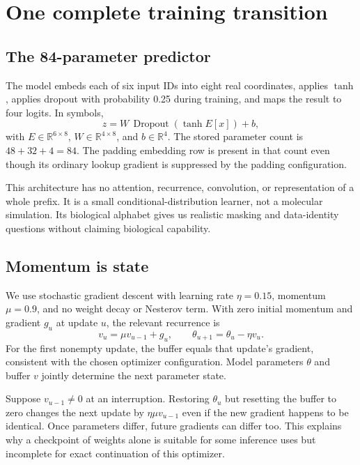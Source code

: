 \section{One complete training transition}

\subsection{The 84-parameter predictor}

The model embeds each of six input IDs into eight real coordinates, applies $\tanh$, applies dropout with probability 0.25 during training, and maps the result to four logits. In symbols,
\begin{equation}
z=W\,\operatorname{Dropout}(\tanh E[x])+b,
\end{equation}
with $E\in\mathbb R^{6\times8}$, $W\in\mathbb R^{4\times8}$, and $b\in\mathbb R^4$. The stored parameter count is $48+32+4=84$. The padding embedding row is present in that count even though its ordinary lookup gradient is suppressed by the padding configuration.

This architecture has no attention, recurrence, convolution, or representation of a whole prefix. It is a small conditional-distribution learner, not a molecular simulation. Its biological alphabet gives us realistic masking and data-identity questions without claiming biological capability.

\subsection{Momentum is state}

We use stochastic gradient descent with learning rate $\eta=0.15$, momentum $\mu=0.9$, and no weight decay or Nesterov term. With zero initial momentum and gradient $g_u$ at update $u$, the relevant recurrence is
\begin{equation}
v_u=\mu v_{u-1}+g_u,\qquad
\theta_{u+1}=\theta_u-\eta v_u. \label{eq:momentum}
\end{equation}
For the first nonempty update, the buffer equals that update's gradient, consistent with the chosen optimizer configuration. Model parameters $\theta$ and buffer $v$ jointly determine the next parameter state.

Suppose $v_{u-1}\ne0$ at an interruption. Restoring $\theta_u$ but resetting the buffer to zero changes the next update by $\eta\mu v_{u-1}$ even if the new gradient happens to be identical. Once parameters differ, future gradients can differ too. This explains why a checkpoint of weights alone is suitable for some inference uses but incomplete for exact continuation of this optimizer.

